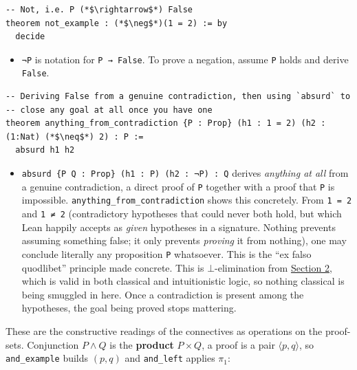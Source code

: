 \begin{lstlisting}
-- Not, i.e. P (*$\rightarrow$*) False
theorem not_example : (*$\neg$*)(1 = 2) := by
  decide
\end{lstlisting}

\begin{itemize}
\tightlist
\item
  \texttt{¬P} is notation for \texttt{P → False}. To prove a negation, assume \texttt{P} holds and derive \texttt{False}.
\end{itemize}

\begin{lstlisting}
-- Deriving False from a genuine contradiction, then using `absurd` to
-- close any goal at all once you have one
theorem anything_from_contradiction {P : Prop} (h1 : 1 = 2) (h2 : (1:Nat) (*$\neq$*) 2) : P :=
  absurd h1 h2
\end{lstlisting}

\begin{itemize}
\tightlist
\item
  \texttt{absurd \{P Q : Prop\} (h1 : P) (h2 : ¬P) : Q} derives \emph{anything at all} from a genuine contradiction, a direct proof of \texttt{P} together with a proof that \texttt{P} is impossible. \texttt{anything\_\allowbreak{}from\_\allowbreak{}contradiction} shows this concretely. From \texttt{1 = 2} and \texttt{1 ≠ 2} (contradictory hypotheses that could never both hold, but which Lean happily accepts as \emph{given} hypotheses in a signature. Nothing prevents assuming something false; it only prevents \emph{proving} it from nothing), one may conclude literally any proposition \texttt{P} whatsoever. This is the ``ex falso quodlibet'' principle made concrete. This is \(\bot\)-elimination from \hyperref[sec:04-propositions-and-proofs:02-logic-recap:1]{Section 2}, which is valid in both classical and intuitionistic logic, so nothing classical is being smuggled in here. Once a contradiction is present among the hypotheses, the goal being proved stops mattering.
\end{itemize}

\begin{mathreading}

These are the constructive readings of the connectives as operations on the proof-sets. Conjunction \(P \wedge Q\) is the \textbf{product} \(P \times Q\), a proof is a pair \(\langle p, q\rangle\), so \texttt{and\_\allowbreak{}example} builds \((p,q)\) and \texttt{and\_\allowbreak{}left} applies \(\pi_1\):

\end{mathreading}

